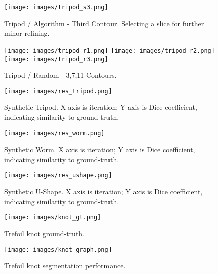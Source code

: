 \begin{figure}[p]
\centering
  \texttt{[image: images/tripod\_s3.png]}
  \caption[Tripod / Algorithm - Third Contour]{
  Tripod / Algorithm - Third Contour.
  Selecting a slice for further minor refining.
  } \label{fig:tripod_smart3}
\end{figure}

\begin{figure}[p]
\centering
  \texttt{[image: images/tripod\_r1.png]}
  \texttt{[image: images/tripod\_r2.png]}
  \texttt{[image: images/tripod\_r3.png]}
  \caption[Tripod / Random]{
  Tripod / Random - 3,7,11 Contours.
  } \label{fig:tripod_random}
\end{figure}

\begin{figure}[p]
\centering
  \texttt{[image: images/res\_tripod.png]}
  \caption[Synthetic Tripod]{
  Synthetic Tripod.
  X axis is iteration; Y axis is Dice coefficient, indicating similarity to ground-truth.
  }\label{fig:resTripod}
\end{figure}

\begin{figure}[p]
\centering
  \texttt{[image: images/res\_worm.png]}
  \caption[Synthetic Worm]{
  Synthetic Worm.
  X axis is iteration; Y axis is Dice coefficient, indicating similarity to ground-truth.
  }\label{fig:resWorm}
\end{figure}

\begin{figure}[p]
\centering
  \texttt{[image: images/res\_ushape.png]}
  \caption[Synthetic U-Shape]{
  Synthetic U-Shape.
  X axis is iteration; Y axis is Dice coefficient, indicating similarity to ground-truth.
  }\label{fig:resUshape}
\end{figure}


\begin{figure}[t]
	\centering
  \texttt{[image: images/knot\_gt.png]} 
  \caption[Trefoil Knot Ground-Truth]{
  Trefoil knot ground-truth.
  }\label{fig:resKnotGT}
\end{figure}
\begin{figure}[b]
	\centering
  \texttt{[image: images/knot\_graph.png]}
  \caption[Trefoil Knot Segmentation Performance]{
  Trefoil knot segmentation performance.
  }\label{fig:resKnotPerf}
\end{figure}

